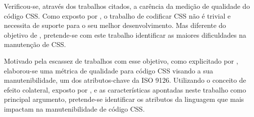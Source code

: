 Verificou-se, através dos trabalhos citados, a carência da medição de qualidade do código CSS. Como exposto por , o trabalho de codificar CSS não é trivial e necessita de suporte para o seu melhor desenvolvimento. Mas diferente do objetivo de , pretende-se com este trabalho identificar as maiores dificuldades na manutenção de CSS. 

Motivado pela escassez de trabalhos com esse objetivo, como explicitado por , elaborou-se uma métrica de qualidade para código CSS visando a sua manutenibilidade, um dos atributos-chave da ISO 9126. Utilizando o conceito de efeito colateral, exposto por , e as características apontadas neste trabalho como principal argumento, pretende-se identificar os atributos da linguagem  que mais impactam na manutenibilidade de código CSS.%